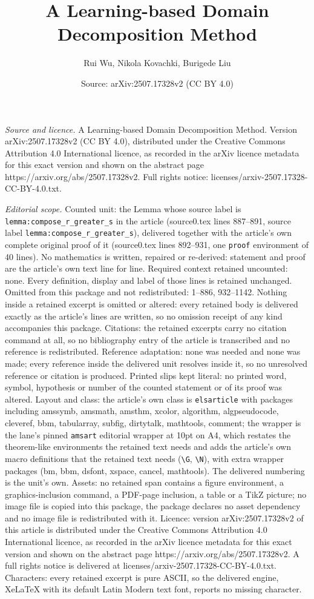 \documentclass[10pt,a4paper]{amsart}
\title[A Learning-based Domain Decomposition Method]{A Learning-based Domain Decomposition Method}
\author{Rui Wu, Nikola Kovachki, Burigede Liu}
\date{Source: arXiv:2507.17328v2 (CC BY 4.0)}
\begin{document}
\maketitle

\noindent\emph{Source and licence.} A Learning-based Domain Decomposition Method. Version arXiv:2507.17328v2 (CC BY 4.0), distributed under the Creative Commons Attribution 4.0 International licence, as recorded in the arXiv licence metadata for this exact version and shown on the abstract page https://arxiv.org/abs/2507.17328v2. Full rights notice: licenses/arxiv-2507.17328-CC-BY-4.0.txt.\par\smallskip

\noindent\textit{Editorial scope.} Counted unit: the Lemma whose source label is \texttt{lemma:compose\_r\_greater\_s} in the article (source0.tex lines 887--891, source label \texttt{lemma:compose\_r\_greater\_s}), delivered together with the article's own complete original proof of it (source0.tex lines 892--931, one \texttt{proof} environment of 40 lines). No mathematics is written, repaired or re-derived: statement and proof are the article's own text line for line. Required context retained uncounted: none. Every definition, display and label of those lines is retained unchanged. Omitted from this package and not redistributed: 1--886, 932--1142. Nothing inside a retained excerpt is omitted or altered: every retained body is delivered exactly as the article's lines are written, so no omission receipt of any kind accompanies this package. Citations: the retained excerpts carry no citation command at all, so no bibliography entry of the article is transcribed and no reference is redistributed. Reference adaptation: none was needed and none was made; every reference inside the delivered unit resolves inside it, so no unresolved reference or citation is produced. Printed slips kept literal: no printed word, symbol, hypothesis or number of the counted statement or of its proof was altered. Layout and class: the article's own class is \texttt{elsarticle} with packages including amssymb, amsmath, amsthm, xcolor, algorithm, algpseudocode, cleveref, bbm, tabularray, subfig, dirtytalk, mathtools, comment; the wrapper is the lane's pinned \texttt{amsart} editorial wrapper at 10pt on A4, which restates the theorem-like environments the retained text needs and adds the article's own macro definitions that the retained text needs (\texttt{\textbackslash G}, \texttt{\textbackslash N}), with extra wrapper packages (bm, bbm, dsfont, xspace, cancel, mathtools). The delivered numbering is the unit's own. Assets: no retained span contains a figure environment, a graphics-inclusion command, a PDF-page inclusion, a table or a TikZ picture; no image file is copied into this package, the package declares no asset dependency and no image file is redistributed with it. Licence: version arXiv:2507.17328v2 of this article is distributed under the Creative Commons Attribution 4.0 International licence, as recorded in the arXiv licence metadata for this exact version and shown on the abstract page https://arxiv.org/abs/2507.17328v2. A full rights notice is delivered at licenses/arxiv-2507.17328-CC-BY-4.0.txt. Characters: every retained excerpt is pure ASCII, so the delivered engine, XeLaTeX with its default Latin Modern text font, reports no missing character.
\end{document}
